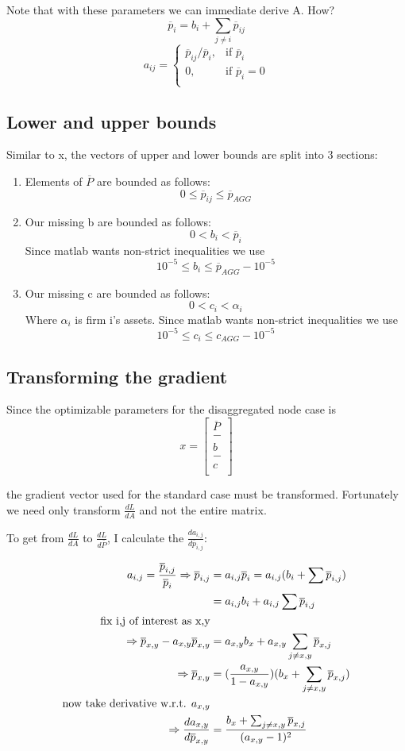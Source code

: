 \documentclass{article}
\newcommand{\?}{\stackrel{?}{=}}
\newcommand{\pbar}{\overline{p}}
\newcommand{\Pbar}{\overline{P}}
\begin{document}
Note that with these parameters we can immediate derive A. How?
$$\pbar_i=b_i+\sum_{j\neq i}\pbar_{ij}$$
		\[ a_{ij} = \begin{cases}
	                                   \pbar_{ij}/\pbar_i, & \text{if $\pbar_i$} \\
	                                   0, & \text{if $\pbar_i=0$} \\
		\end{cases} \]


\subsection{Lower and upper bounds}
Similar to x, the vectors of upper and lower bounds are split into 3 sections:
\begin{enumerate}
\item Elements of $\Pbar$ are bounded as follows:
$$0\leq \pbar_{ij}\leq \pbar_{AGG}$$
\item Our missing b are bounded as follows:
$$0<b_i<\pbar_i$$
Since matlab wants non-strict inequalities we use
$$10^{-5}\leq b_i\leq\pbar_{AGG}-10^{-5}$$
\item Our missing c are bounded as follows:
$$0<c_i<\alpha_i$$
Where $\alpha_i$ is firm i's assets. Since matlab wants non-strict inequalities we use
$$10^{-5}\leq c_i\leq c_{AGG}-10^{-5}$$
\end{enumerate}

\subsection{Transforming the gradient}

Since the optimizable parameters for the disaggregated node case is
$$x= 
\begin{bmatrix}
\Pbar \\
- \\
b \\
- \\
c \\
\end{bmatrix}
$$

the gradient vector used for the standard case must be transformed. Fortunately we need only transform $\frac{dL}{dA}$ and not the entire matrix.

To get from $\frac{dL}{dA}$ to $\frac{dL}{d\Pbar}$, I calculate the $\frac{da_{i,j}}{d\pbar_{i,j}}$:

\begin{align*}
a_{i,j} = \frac{\pbar_{i,j}}{\pbar_i} \Rightarrow \pbar_{i,j}&=a_{i,j}\pbar_i = a_{i,j}(b_i + \sum\pbar_{i,j}) \\
&= a_{i,j}b_i + a_{i,j}\sum\pbar_{i,j} \\
\hbox{fix i,j of interest as x,y} \\
\Rightarrow \pbar_{x,y} - a_{x,y}\pbar_{x,y} &= a_{x,y}b_x + a_{x,y}\sum_{j\neq x,y} \pbar_{x,j} \\
\Rightarrow \pbar_{x,y} &= (\frac{a_{x,y}}{1-a_{x,y}})(b_x+\sum_{j\neq x,y} \pbar_{x,j}) \\
\hbox{now take derivative w.r.t. } a_{x,y} \\
\Rightarrow \frac{da_{x,y}}{d\pbar_{x,y}} &= \frac{b_x+\sum_{j\neq x,y} \pbar_{x,j}}{(a_{x,y} - 1)^2}
\end{align*}
\end{document}
